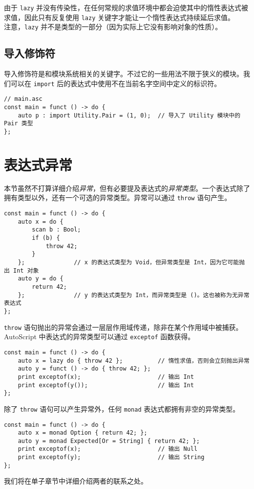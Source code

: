 由于 \lstinline!lazy! 并没有传染性，在任何常规的求值环境中都会迫使其中的惰性表达式被求值，因此只有反复使用 \lstinline!lazy! 关键字才能让一个惰性表达式持续延后求值。 \\

注意，\lstinline!lazy! 并不是类型的一部分（因为实际上它没有影响对象的性质）。

\subsection{导入修饰符}

导入修饰符是和模块系统相关的关键字。不过它的一些用法不限于狭义的模块。我们可以在 \lstinline!import! 后的表达式中使用不在当前名字空间中定义的标识符。

\begin{lstlisting}
// main.asc
const main = funct () -> do {
	auto p : import Utility.Pair = (1, 0);	// 导入了 Utility 模块中的 Pair 类型
};
\end{lstlisting}


\section{表达式异常}

本节虽然不打算详细介绍\emph{异常}，但有必要提及表达式的\emph{异常类型}。一个表达式除了拥有类型以外，还有一个可选的异常类型。异常可以通过 \lstinline!throw! 语句产生。

\begin{lstlisting}
const main = funct () -> do {
    auto x = do {
    	scan b : Bool;
    	if (b) {
    	    throw 42;
    	}
    };              // x 的表达式类型为 Void，但异常类型是 Int，因为它可能抛出 Int 对象
    auto y = do {
    	return 42;
    };				// y 的表达式类型为 Int，而异常类型是 ()。这也被称为无异常表达式
};
\end{lstlisting}

\lstinline!throw! 语句抛出的异常会通过一层层作用域传递，除非在某个作用域中被捕获。AutoScript 中表达式的异常类型可以通过 \lstinline!exceptof! 函数获得。

\begin{lstlisting}
const main = funct () -> do {
    auto x = lazy do { throw 42 };			// 惰性求值，否则会立刻抛出异常
    auto y = funct () -> do { throw 42; };
    print exceptof(x);                      // 输出 Int
    print exceptof(y());                    // 输出 Int
};
\end{lstlisting}

除了 \lstinline!throw! 语句可以产生异常外，任何 \lstinline!monad! 表达式都拥有非空的异常类型。

\begin{lstlisting}
const main = funct () -> do {
	auto x = monad Option { return 42; };
	auto y = monad Expected[Or = String] { return 42; };
	print exceptof(x);						// 输出 Null
	print exceptof(y);						// 输出 String
};
\end{lstlisting}

我们将在单子章节中详细介绍两者的联系之处。